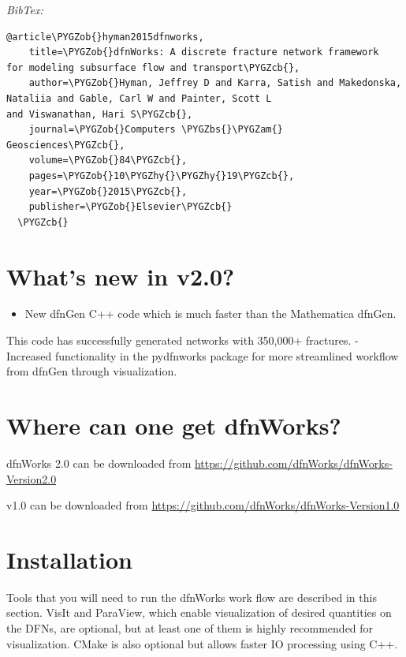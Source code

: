 \documentclass[letterpaper,10pt,english]{sphinxmanual}
\def\PYGZbs{\char`\\}
\def\PYGZob{\char`\{}
\def\PYGZcb{\char`\}}
\def\PYGZam{\char`\&}
\def\PYGZhy{\char`\-}
\begin{document}
\emph{BibTex:}

\begin{Verbatim}[commandchars=\\\{\}]
  @article\PYGZob{}hyman2015dfnworks,
    title=\PYGZob{}dfnWorks: A discrete fracture network framework
for modeling subsurface flow and transport\PYGZcb{},
    author=\PYGZob{}Hyman, Jeffrey D and Karra, Satish and Makedonska,
Nataliia and Gable, Carl W and Painter, Scott L
and Viswanathan, Hari S\PYGZcb{},
    journal=\PYGZob{}Computers \PYGZbs{}\PYGZam{} Geosciences\PYGZcb{},
    volume=\PYGZob{}84\PYGZcb{},
    pages=\PYGZob{}10\PYGZhy{}\PYGZhy{}19\PYGZcb{},
    year=\PYGZob{}2015\PYGZcb{},
    publisher=\PYGZob{}Elsevier\PYGZcb{}
  \PYGZcb{}
\end{Verbatim}


\section{What's new in v2.0?}
\label{intro:what-s-new-in-v2-0}\begin{itemize}
\item {} 
New dfnGen C++ code which is much faster than the Mathematica dfnGen.

\end{itemize}

This code has successfully generated networks with 350,000+ fractures.
- Increased functionality in the pydfnworks package for more streamlined
workflow from dfnGen through visualization.


\section{Where can one get dfnWorks?}
\label{intro:where-can-one-get-dfnworks}
dfnWorks 2.0 can be downloaded from \href{https://github.com/dfnWorks/dfnWorks-Version2.0}{https://github.com/dfnWorks/dfnWorks-Version2.0}

v1.0 can be downloaded from \href{https://github.com/dfnWorks/dfnWorks-Version1.0}{https://github.com/dfnWorks/dfnWorks-Version1.0}


\section{Installation}
\label{intro:installation}
Tools that you will need to run the dfnWorks work flow are described in
this section. VisIt and ParaView, which enable visualization of desired
quantities on the DFNs, are optional, but at least one of them is highly
recommended for visualization. CMake is also optional but allows faster IO
processing using C++.
\end{document}
